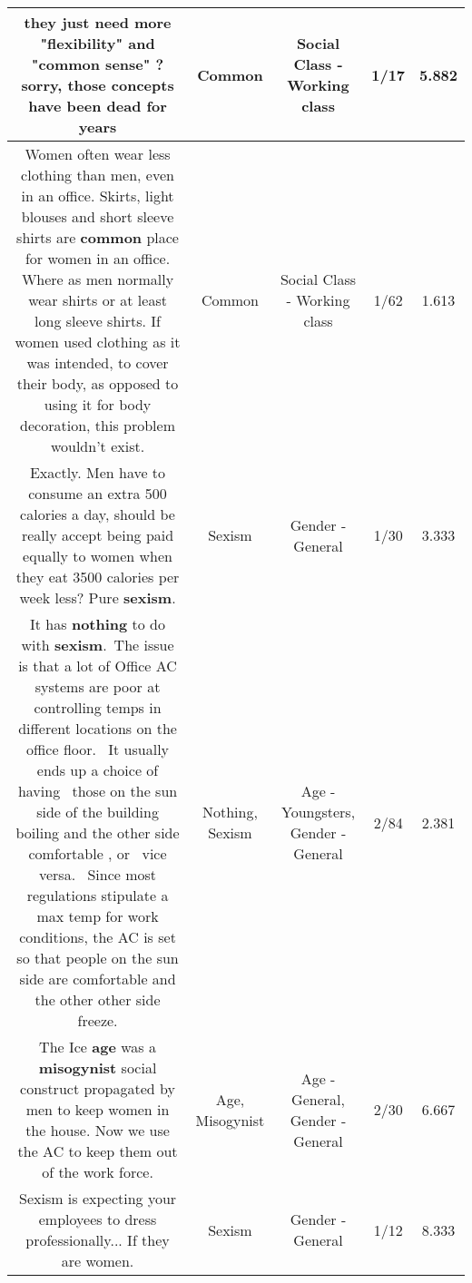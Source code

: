 \documentclass[11pt]{article}
\newlength\mylength
\begin{document}
\begin{center}
\begin{longtable}{|C{.65\mylength}|C{.30\mylength}|C{.12\mylength}|C{.12\mylength}|C{.12\mylength}|}
  \small they just need more "flexibility" and "\textbf{common} sense" ? sorry, those concepts have been dead for years\normalsize   & Common & Social Class - Working class & 1/17 & 5.882 \\  \hline
  \small Women often wear less clothing than men, even in an office. Skirts, light blouses and short sleeve shirts are \textbf{common} place for women in an office. Where as men normally wear shirts or at least long sleeve shirts. If women used clothing as it was intended, to cover their body, as opposed to using it for body decoration, this problem wouldn't exist.\normalsize   & Common & Social Class - Working class & 1/62 & 1.613 \\  \hline
  \small Exactly. Men have to consume an extra 500 calories a day, should be really accept being paid equally to women when they eat 3500 calories per week less? Pure \textbf{sexism}.\normalsize   & Sexism & Gender - General & 1/30 & 3.333 \\  \hline
  \small It has \textbf{nothing} to do with \textbf{sexism}. The issue is that a lot of Office AC systems are poor at controlling temps in different locations on the office floor.  It usually ends up a choice of having  those on the sun side of the building boiling and the other side comfortable , or  vice versa.  Since most regulations stipulate a max temp for work conditions, the AC is set so that people on the sun side are comfortable and the other other side freeze.\normalsize   & Nothing, Sexism & Age - Youngsters, Gender - General & 2/84 & 2.381 \\  \hline
  \small The Ice \textbf{age} was a \textbf{misogynist} social construct propagated by men to keep women in the house. Now we use the AC to keep them out of the work force.\normalsize   & Age, Misogynist & Age - General, Gender - General & 2/30 & 6.667 \\  \hline
  \small Sexism is expecting your employees to dress professionally... If they are women.\normalsize   & Sexism & Gender - General & 1/12 & 8.333 \\  \hline

\end{longtable}
\end{center}
\end{document}
